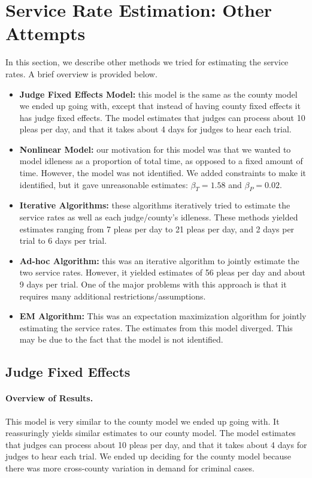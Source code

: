 \documentclass[11pt, oneside]{article}   	%
\theoremstyle{ModifiedStyle}
\begin{document}
\section{Service Rate Estimation: Other Attempts}
  In this section, we describe other methods we tried for estimating the service rates. A brief overview is provided below.
	\begin{itemize}
		\item \textbf{Judge Fixed Effects Model:} this model is the same as the county model we ended up going with, except that instead of having county fixed effects it has judge fixed effects. The model estimates that
		judges can process about 10 pleas per day, and that it takes about 4 days for judges to hear each trial.
		\item \textbf{Nonlinear Model:} our motivation for this model was that we wanted to model idleness as a proportion of total time, as opposed to a fixed amount of time. However, the model was not identified. We added constraints to make it identified, but it gave unreasonable estimates: $\beta_T = 1.58$ and $\beta_P=0.02$.
		\item \textbf{Iterative Algorithms:} these algorithms iteratively tried to estimate the service rates as well as each judge/county's idleness. These methods yielded estimates ranging from 7 pleas per day to 21 pleas per day, and 2 days per trial to 6 days per trial.
		\item \textbf{Ad-hoc Algorithm:} this was an iterative algorithm to jointly estimate the two service rates. However, it yielded estimates of 56 pleas per day and about 9 days per trial. One of the major problems with this approach is that it requires many additional restrictions/assumptions.
		\item \textbf{EM Algorithm:} This was an expectation maximization algorithm for jointly estimating the service rates. The estimates from this model diverged. This may be due to the fact that the model is not identified.
	\end{itemize}

	\subsection{Judge Fixed Effects}
	  \label{app-judge-fixed-effects}
		\paragraph{Overview of Results.} This model is very similar to the county model we ended up going with. It reassuringly yields similar estimates to our county model. The model estimates that judges can process about 10 pleas per day, and that it takes about 4 days for judges to hear each trial. We ended up deciding for the county model because there was more cross-county variation in demand for criminal cases.
\end{document}
